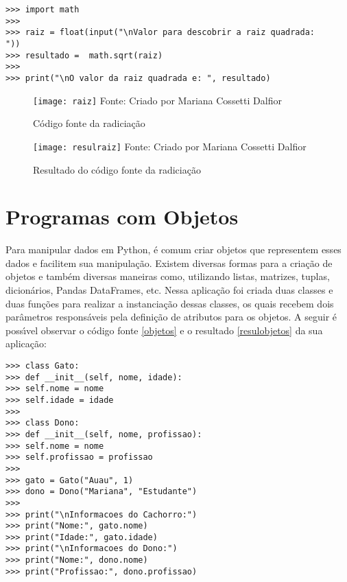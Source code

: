 \begin{lstlisting}
>>> import math
>>> 
>>> raiz = float(input("\nValor para descobrir a raiz quadrada: 
"))
>>> resultado =  math.sqrt(raiz)
>>> 
>>> print("\nO valor da raiz quadrada e: ", resultado)
\end{lstlisting}

    \begin{figure}[H]
	\begin{center}
		\caption{C\'{o}digo fonte da radicia\c{c}\~{a}o} \label{fonteraiz}
		\texttt{[image: raiz]} 
		\newline
		Fonte: Criado por Mariana Cossetti Dalfior
	\end{center}
\end{figure}

\begin{figure}[H]
	\begin{center}
		\caption{Resultado do c\'{o}digo fonte da radicia\c{c}\~{a}o} \label{resulraiz}
		\texttt{[image: resulraiz]} 
		\newline
		Fonte: Criado por Mariana Cossetti Dalfior
	\end{center}
\end{figure}

    \section{Programas com Objetos}
Para manipular dados em Python, \'{e} comum criar objetos que representem esses dados e facilitem sua manipula\c{c}\~{a}o. Existem diversas formas para a cria\c{c}\~{a}o de objetos e tamb\'{e}m diversas maneiras como, utilizando listas, matrizes, tuplas, dicion\'{a}rios, Pandas DataFrames, etc. Nessa aplica\c{c}\~{a}o foi criada duas classes e duas fun\c{c}\~{o}es para realizar a instancia\c{c}\~{a}o dessas classes, os quais recebem dois par\^{a}metros respons\'{a}veis pela defini\c{c}\~{a}o de atributos para os objetos. A seguir \'{e} poss\'{\i}vel observar o c\'{o}digo fonte \ref{objetos} e o resultado \ref{resulobjetos} da sua aplica\c{c}\~{a}o:
    
\begin{lstlisting}
>>> class Gato:
>>> def __init__(self, nome, idade):
>>> self.nome = nome
>>> self.idade = idade
>>> 
>>> class Dono:
>>> def __init__(self, nome, profissao):
>>> self.nome = nome
>>> self.profissao = profissao
>>> 
>>> gato = Gato("Auau", 1)
>>> dono = Dono("Mariana", "Estudante")
>>> 
>>> print("\nInformacoes do Cachorro:")
>>> print("Nome:", gato.nome)
>>> print("Idade:", gato.idade)
>>> print("\nInformacoes do Dono:")
>>> print("Nome:", dono.nome)
>>> print("Profissao:", dono.profissao)
\end{lstlisting}
    

